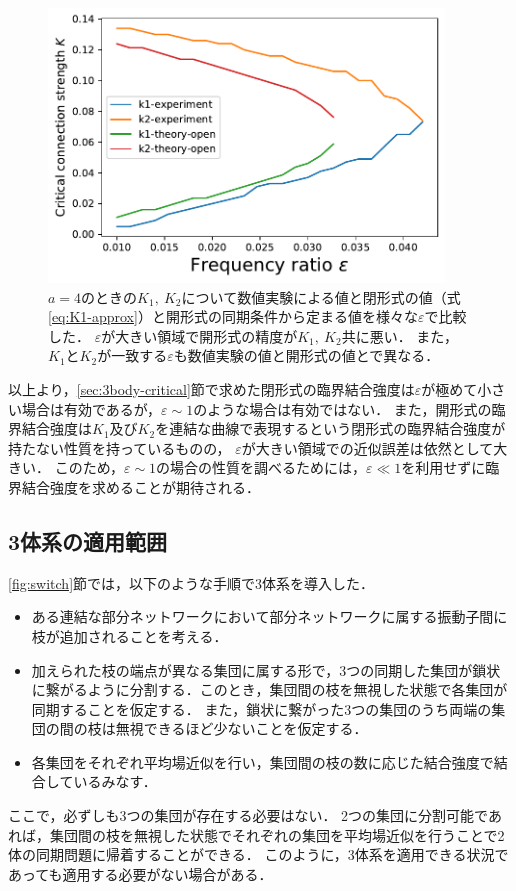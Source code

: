 \documentclass[../main]{subfiles}
\begin{document}
\begin{figure}[tbp]
\centering
\includegraphics[width=105mm]{./images/k1k2-compare.pdf}
\centering
\caption{$a=4$のときの$K_1,\ K_2$について数値実験による値と閉形式の値（式\eqref{eq:K1-approx}）と開形式の同期条件から定まる値を様々な$\varepsilon$で比較した．
$\varepsilon$が大きい領域で開形式の精度が$K_1,\ K_2$共に悪い．
また，$K_1$と$K_2$が一致する$\varepsilon$も数値実験の値と開形式の値とで異なる．}
\label{fig:k1k2-compare}
\end{figure}

以上より，\ref{sec:3body-critical}節で求めた閉形式の臨界結合強度は$\varepsilon$が極めて小さい場合は有効であるが，$\varepsilon\sim 1$のような場合は有効ではない．
また，開形式の臨界結合強度は$K_1$及び$K_2$を連結な曲線で表現するという閉形式の臨界結合強度が持たない性質を持っているものの，
$\varepsilon$が大きい領域での近似誤差は依然として大きい．
このため，$\varepsilon\sim 1$の場合の性質を調べるためには，$\varepsilon\ll 1$を利用せずに臨界結合強度を求めることが期待される．

\subsection{3体系の適用範囲}
\label{sec:3body-application}
\ref{fig:switch}節では，以下のような手順で3体系を導入した．
\begin{itemize}
    \item ある連結な部分ネットワークにおいて部分ネットワークに属する振動子間に枝が追加されることを考える．
    \item 加えられた枝の端点が異なる集団に属する形で，3つの同期した集団が鎖状に繋がるように分割する．このとき，集団間の枝を無視した状態で各集団が同期することを仮定する．
    また，鎖状に繋がった3つの集団のうち両端の集団の間の枝は無視できるほど少ないことを仮定する．
    \item 各集団をそれぞれ平均場近似を行い，集団間の枝の数に応じた結合強度で結合しているみなす．
\end{itemize}
ここで，必ずしも3つの集団が存在する必要はない．
2つの集団に分割可能であれば，集団間の枝を無視した状態でそれぞれの集団を平均場近似を行うことで2体の同期問題に帰着することができる．
このように，3体系を適用できる状況であっても適用する必要がない場合がある．
\end{document}
